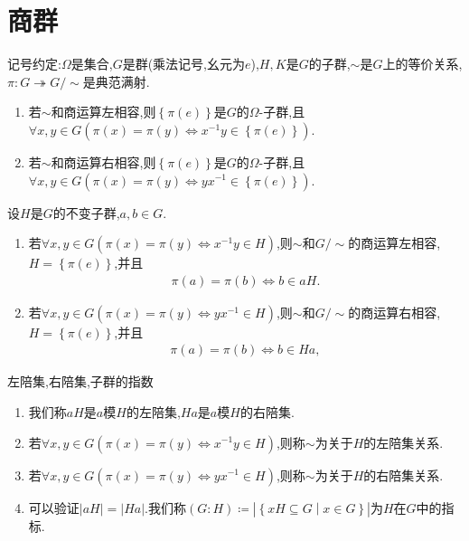\section{商群}

记号约定:$\Omega$是集合,$G$是群(乘法记号,幺元为$e$),$H,K$是$G$的子群,$\sim$是$G$上的等价关系,$\pi:G\twoheadrightarrow G/\sim$是典范满射.

\begin{proposition}{}{}
	\begin{enumerate}
		\item 若$\sim$和商运算左相容,则$\left\{\pi\left(e\right)\right\}$是$G$的$\Omega$-子群,且$\forall x,y\in G\left(\pi\left(x\right)=\pi\left(y\right)\iff x^{-1}y\in\left\{\pi\left(e\right)\right\}\right)$.
		\item 若$\sim$和商运算右相容,则$\left\{\pi\left(e\right)\right\}$是$G$的$\Omega$-子群,且$\forall x,y\in G\left(\pi\left(x\right)=\pi\left(y\right)\iff yx^{-1}\in\left\{\pi\left(e\right)\right\}\right)$.
	\end{enumerate}
\end{proposition}

\begin{proposition}{}{}
	设$H$是$G$的不变子群,$a,b\in G$.
	\begin{enumerate}
		\item 若$\forall x,y\in G\left(\pi\left(x\right)=\pi\left(y\right)\iff x^{-1}y\in H\right)$,则$\sim$和$G/\sim$的商运算左相容,$H=\left\{\pi\left(e\right)\right\}$,并且
		\begin{align*}
			\pi\left(a\right)=\pi\left(b\right)\iff b\in aH.
		\end{align*}
		\item 若$\forall x,y\in G\left(\pi\left(x\right)=\pi\left(y\right)\iff yx^{-1}\in H\right)$,则$\sim$和$G/\sim$的商运算右相容,$H=\left\{\pi\left(e\right)\right\}$,并且
		\begin{align*}
			\pi\left(a\right)=\pi\left(b\right)\iff b\in Ha,
		\end{align*}
	\end{enumerate}
\end{proposition}

\begin{definition}{左陪集,右陪集,子群的指数}{}
	\begin{enumerate}
		\item 我们称$aH$是$a$模$H$的左陪集,$Ha$是$a$模$H$的右陪集.
		\item 若$\forall x,y\in G\left(\pi\left(x\right)=\pi\left(y\right)\iff x^{-1}y\in H\right)$,则称$\sim$为关于$H$的左陪集关系.
		\item 若$\forall x,y\in G\left(\pi\left(x\right)=\pi\left(y\right)\iff yx^{-1}\in H\right)$,则称$\sim$为关于$H$的右陪集关系.
		\item 可以验证$\left|aH\right|=\left|Ha\right|$.我们称$\left(G:H\right)\coloneq\left|\left\{xH\subseteq G\middle|x\in G\right\}\right|$为$H$在$G$中的指标.
	\end{enumerate}
\end{definition}

